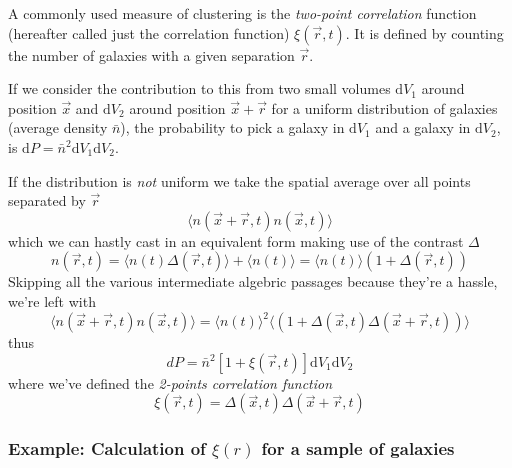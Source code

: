 \par A commonly used measure of clustering is the \emph{two-point correlation} function (hereafter called just the correlation function) $\xi(\vec{r},t)$. It is defined by counting the number of galaxies with a given separation $\vec{r}$.
\par If we consider the contribution to this from two small volumes $\text{d}V_{1}$ around position $\vec{x}$ and $\text{d}V_{2}$ around position $\vec{x}+\vec{r}$ for a uniform distribution of galaxies (average density $\bar{n}$), the probability to pick a galaxy in $\text{d}V_{1}$ and a galaxy in $\text{d}V_{2}$, is $\text{d}P = \bar{n}^{2}\text{d}V_{1}\text{d}V_{2}$.
\par If the distribution is \emph{not} uniform we take the spatial average over all points separated by $\vec{r}$
\begin{equation*}
    \langle n(\vec{x}+\vec{r},t)n(\vec{x},t)\rangle
\end{equation*}
which we can hastly cast in an equivalent form making use of the contrast $\Delta$
\begin{equation*}
    n(\vec{r},t) = \langle n(t)\Delta(\vec{r},t)\rangle + \langle n(t) \rangle = \langle n(t) \rangle(1+\Delta(\vec{r},t))
\end{equation*}
Skipping all the various intermediate algebric passages because they're a hassle, we're left with 
\begin{equation*}
    \langle n(\vec{x}+\vec{r},t)n(\vec{x},t)\rangle = \langle n(t) \rangle^{2}\langle (1+\Delta(\vec{x},t)\Delta(\vec{x}+\vec{r},t)) \rangle
\end{equation*}
thus 
\begin{equation*}
    dP = \bar{n}^{2}\left[1+\xi(\vec{r},t)\right]\text{d}V_{1}\text{d}V_{2}
\end{equation*}
where we've defined the \emph{2-points correlation function}
\begin{equation}
    \boxed{
        \xi(\vec{r},t) = \Delta(\vec{x},t)\Delta(\vec{x}+\vec{r},t)
    }
    \label{eq:twopointcorrelation}
\end{equation}

\subsubsection*{Example: Calculation of $\xi(r)$ for a sample of galaxies}

